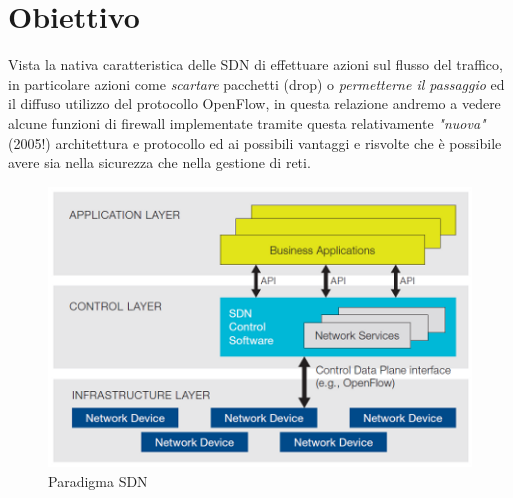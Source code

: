 \section{Obiettivo}
Vista la nativa caratteristica delle SDN di effettuare azioni sul flusso del traffico, in particolare azioni come \textit{scartare} pacchetti (drop) o \textit{permetterne il passaggio} ed il diffuso utilizzo del protocollo OpenFlow, in questa relazione andremo a vedere alcune funzioni di firewall implementate tramite questa relativamente \textit{"nuova"} (2005!) architettura e protocollo ed ai possibili vantaggi e risvolte che è possibile avere sia nella sicurezza che nella gestione di reti.


\begin{figure}[H]
  \centering
    \includegraphics[width=\linewidth]{img/sdn-arch.png}
    \caption{Paradigma SDN}
  \label{fig:coffee}
\end{figure}
